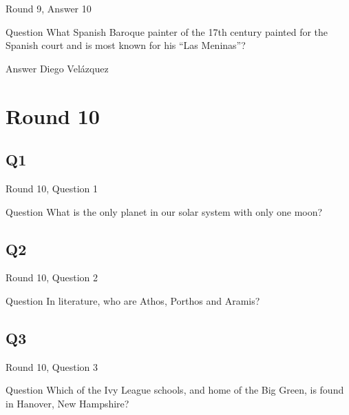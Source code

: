\documentclass[11pt]{beamer}
\begin{document}
\begin{frame}[t]{Round 9, Answer 10}
\vspace{2em}
\begin{block}{Question}
What Spanish Baroque painter of the 17th century painted for the Spanish court and is most known for his ``Las Meninas''\@?
\end{block}
\pause{}
\begin{block}{Answer}
Diego Velázquez
\end{block}
\end{frame}
    

\section{Round 10}
    

\subsection*{Q1}
\begin{frame}[t]{Round 10, Question 1}
\vspace{2em}
\begin{block}{Question}
What is the only planet in our solar system with only one moon\@?
\end{block}
\end{frame}
    

\subsection*{Q2}
\begin{frame}[t]{Round 10, Question 2}
\vspace{2em}
\begin{block}{Question}
In literature, who are Athos, Porthos and Aramis\@?
\end{block}
\end{frame}
    

\subsection*{Q3}
\begin{frame}[t]{Round 10, Question 3}
\vspace{2em}
\begin{block}{Question}
Which of the Ivy League schools, and home of the Big Green, is found in Hanover, New Hampshire\@?
\end{block}
\end{frame}
    
\end{document}
